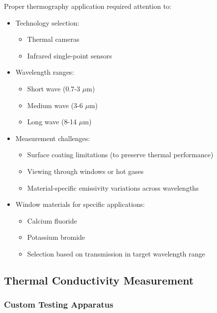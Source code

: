 Proper thermography application required attention to:
\begin{itemize}
    \item Technology selection:
    \begin{itemize}
        \item Thermal cameras
        \item Infrared single-point sensors
    \end{itemize}
    \item Wavelength ranges:
    \begin{itemize}
        \item Short wave (0.7-3 $\mu$m)
        \item Medium wave (3-6 $\mu$m)
        \item Long wave (8-14 $\mu$m)
    \end{itemize}
    \item Measurement challenges:
    \begin{itemize}
        \item Surface coating limitations (to preserve thermal performance)
        \item Viewing through windows or hot gases
        \item Material-specific emissivity variations across wavelengths
    \end{itemize}
    \item Window materials for specific applications:
    \begin{itemize}
        \item Calcium fluoride
        \item Potassium bromide
        \item Selection based on transmission in target wavelength range
    \end{itemize}
\end{itemize}

\subsection*{Thermal Conductivity Measurement}

\subsubsection*{Custom Testing Apparatus}


